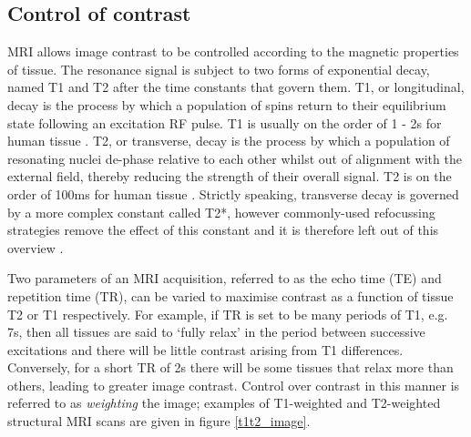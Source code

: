  
\subsection{Control of contrast}

MRI allows image contrast to be controlled according to the magnetic properties of tissue. The resonance signal is subject to two forms of exponential decay, named T1 and T2 after the time constants that govern them. T1, or longitudinal, decay is the process by which a population of spins return to their equilibrium state following an excitation RF pulse. T1 is usually on the order of 1 - 2s for human tissue \cite{Alsop2015}. T2, or transverse, decay is the process by which a population of resonating nuclei de-phase relative to each other whilst out of alignment with the external field, thereby reducing the strength of their overall signal. T2 is on the order of 100ms for human tissue \cite{Buxton2009}. Strictly speaking, transverse decay is governed by a more complex constant called T2*, however commonly-used refocussing strategies remove the effect of this constant and it is therefore left out of this overview \cite{bushberg2011}. 

Two parameters of an MRI acquisition, referred to as the echo time (TE) and repetition time (TR), can be varied to maximise contrast as a function of tissue T2 or T1 respectively. For example, if TR is set to be many periods of T1, e.g. 7s, then all tissues are said to `fully relax' in the period between successive excitations and there will be little contrast arising from T1 differences. Conversely, for a short TR of 2s there will be some tissues that relax more than others, leading to greater image contrast. Control over contrast in this manner is referred to as \textit{weighting} the image; examples of T1-weighted and T2-weighted structural MRI scans are given in figure \ref{t1t2_image}. 

